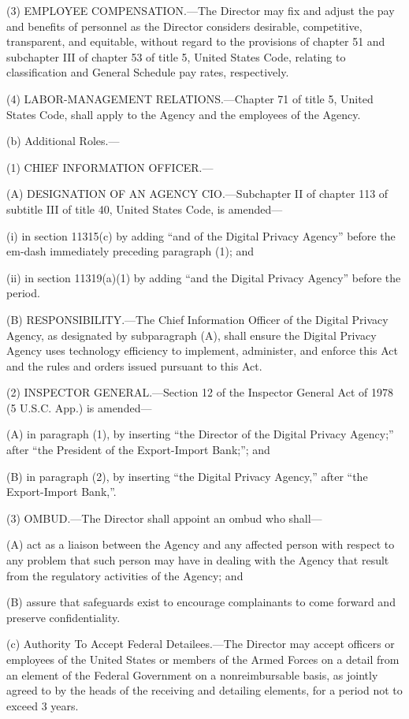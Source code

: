 (3) EMPLOYEE COMPENSATION.—The Director may fix and adjust the pay and benefits of personnel as the Director considers desirable, competitive, transparent, and equitable, without regard to the provisions of chapter 51 and subchapter III of chapter 53 of title 5, United States Code, relating to classification and General Schedule pay rates, respectively.

(4) LABOR-MANAGEMENT RELATIONS.—Chapter 71 of title 5, United States Code, shall apply to the Agency and the employees of the Agency.

(b) Additional Roles.—

(1) CHIEF INFORMATION OFFICER.—

(A) DESIGNATION OF AN AGENCY CIO.—Subchapter II of chapter 113 of subtitle III of title 40, United States Code, is amended—

(i) in section 11315(c) by adding “and of the Digital Privacy Agency” before the em-dash immediately preceding paragraph (1); and

(ii) in section 11319(a)(1) by adding “and the Digital Privacy Agency” before the period.

(B) RESPONSIBILITY.—The Chief Information Officer of the Digital Privacy Agency, as designated by subparagraph (A), shall ensure the Digital Privacy Agency uses technology efficiency to implement, administer, and enforce this Act and the rules and orders issued pursuant to this Act.

(2) INSPECTOR GENERAL.—Section 12 of the Inspector General Act of 1978 (5 U.S.C. App.) is amended—

(A) in paragraph (1), by inserting “the Director of the Digital Privacy Agency;” after “the President of the Export-Import Bank;”; and

(B) in paragraph (2), by inserting “the Digital Privacy Agency,” after “the Export-Import Bank,”.

(3) OMBUD.—The Director shall appoint an ombud who shall—

(A) act as a liaison between the Agency and any affected person with respect to any problem that such person may have in dealing with the Agency that result from the regulatory activities of the Agency; and

(B) assure that safeguards exist to encourage complainants to come forward and preserve confidentiality.

(c) Authority To Accept Federal Detailees.—The Director may accept officers or employees of the United States or members of the Armed Forces on a detail from an element of the Federal Government on a nonreimbursable basis, as jointly agreed to by the heads of the receiving and detailing elements, for a period not to exceed 3 years.


